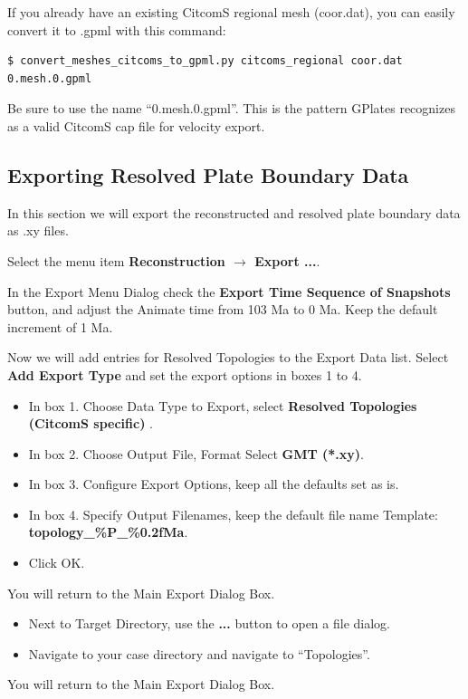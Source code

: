 \documentclass[letterpaper,12pt]{article}
\newcommand{\gp}[1]{\textbf{#1}}
\begin{document}
If you already have an existing CitcomS regional mesh (coor.dat), you can easily convert it to .gpml with this command:
\begin{verbatim}
$ convert_meshes_citcoms_to_gpml.py citcoms_regional coor.dat 0.mesh.0.gpml
\end{verbatim}
Be sure to use the name ``0.mesh.0.gpml''.  
This is the pattern GPlates recognizes as a valid CitcomS cap file for velocity export.


\subsection{Exporting Resolved Plate Boundary Data}
\label{ssect:GPlates_output_1}

In this section we will export the reconstructed and resolved plate boundary data as .xy files.

Select the menu item \gp{Reconstruction $\rightarrow$ Export ...}.

In the Export Menu Dialog check the \gp{Export Time Sequence of Snapshots} button, 
and adjust the Animate time from 103 Ma to 0 Ma.  Keep the default increment of 1 Ma.

Now we will add entries for Resolved Topologies to the Export Data list.
Select \gp{Add Export Type} and set the export options in boxes 1 to 4.

\begin{itemize}
\item In box 1. Choose Data Type to Export, select \gp{Resolved Topologies (CitcomS specific) }.
\item In box 2. Choose Output File, Format Select \gp{GMT (*.xy)}.
\item In box 3. Configure Export Options, keep all the defaults set as is.
\item In box 4. Specify Output Filenames, keep the default file name Template: \gp{topology\_\%P\_\%0.2fMa}.
\item Click OK.
\end{itemize}

You will return to the Main Export Dialog Box.

\begin{itemize}
\item Next to Target Directory, use the \gp{...} button to open a file dialog.
\item Navigate to your case directory and navigate to ``Topologies''.
\end{itemize}

You will return to the Main Export Dialog Box.
\end{document}

